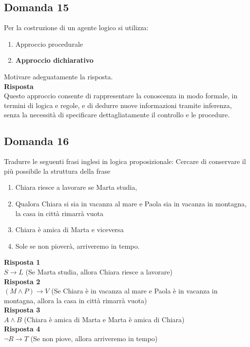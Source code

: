 \documentclass[../main.tex]{subfiles}
\begin{document}
	\subsection{Domanda 15}
	Per la costruzione di un agente logico si utilizza:
	\begin{enumerate}
		\item Approccio procedurale
		\item \textbf{Approccio dichiarativo}
	\end{enumerate}
	Motivare adeguatamente la risposta.\\
	\textbf{Risposta}\\
	Questo approccio consente di rappresentare la conoscenza in modo formale, in termini di logica e regole, e di dedurre nuove informazioni tramite inferenza, senza la necessità di specificare dettagliatamente il controllo e le procedure.
	\subsection{Domanda 16}
	Tradurre le seguenti frasi inglesi in logica proposizionale: Cercare di conservare il più possibile la struttura della frase
	\begin{enumerate}
		\item Chiara riesce a lavorare se Marta studia, 
		\item Qualora Chiara si sia in vacanza al mare e Paola sia in vacanza in montagna, la casa in città rimarrà vuota 
		\item Chiara è amica di Marta e viceversa 
		\item Sole se non pioverà, arriveremo in tempo.
	\end{enumerate}
	\textbf{Risposta 1}\\
	$S \rightarrow L$ (Se Marta studia, allora Chiara riesce a lavorare)\\
	\textbf{Risposta 2}\\
	$(M \land P) \rightarrow V$ (Se Chiara è in vacanza al mare e Paola è in vacanza in montagna, allora la casa in città rimarrà vuota)\\
	\textbf{Risposta 3}\\
	$A \land B$ (Chiara è amica di Marta e Marta è amica di Chiara)\\
	\textbf{Risposta 4}\\
	$\neg R \rightarrow T$ (Se non piove, allora arriveremo in tempo)
\end{document}

